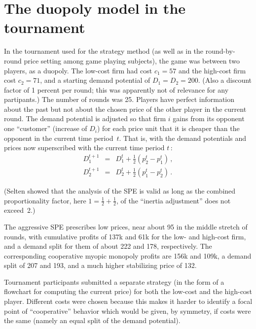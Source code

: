 \documentclass[a4paper,12pt]{article}  %
\theoremstyle{definition}
\begin{document}
\section{The duopoly model in the tournament}

In the tournament used for the strategy method (as well as
in the round-by-round price setting among game playing
subjects), the game was between two players, as a duopoly.
The low-cost firm had cost $c_1=57$ and the high-cost firm
cost $c_2=71$, and a starting demand potential of
$D_1=D_2=200$.
(Also a discount factor of 1 percent per round; this was
apparently not of relevance for any partipants.)
The number of rounds was 25. Players have perfect
information about the past but not about the chosen price of
the other player in the current round.
The demand potential is adjusted so that firm $i$ gains from
its opponent one ``customer'' (increase of $D_i$) for each
price unit that it is cheaper than the opponent in the
current time period~$t$.
That is, with the demand potentials and prices now
superscribed with the current time period $t$\,:
\begin{equation}
\label{demand}
\begin{array}{rcl}
D_1^{t+1}&=&D_1^t+\frac12({p_{2}^t-p_1^t})\,,
\\[1ex]
D_2^{t+1}&=&D_2^t+\frac12({p_{1}^t-p_2^t})\,.
\end{array}
\end{equation}

(Selten showed that the analysis of the SPE is valid as long
as the combined proportionality factor, here
$1=\frac12+\frac12$, of the ``inertia
adjustment'' does not exceed~2.)

The aggressive SPE prescribes low prices, near about 95 in
the middle stretch of rounds, with cumulative profits of 
137k and 61k for the low- and high-cost firm, and a demand
split for them of about 222 and 178, respectively.
The corresponding cooperative myopic monopoly profits are 
156k and 109k, a demand split of 207 and 193, and a much
higher stabilizing price of 132.

Tournament participants submitted a separate strategy (in
the form of a flowchart for computing the current price)
for both the low-cost and the high-cost player.
Different costs were chosen because this makes it harder to
identify a focal point of ``cooperative'' behavior which would
be given, by symmetry, if costs were the same (namely an
equal split of the demand potential). 
\end{document}
